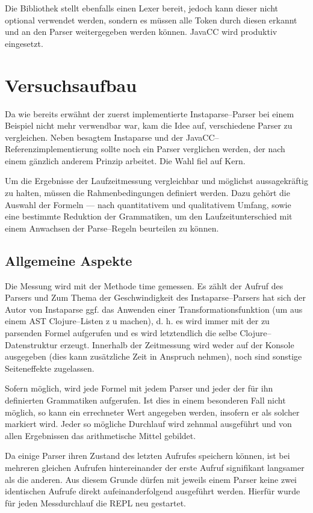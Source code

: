 \documentclass[ngerman,a4paper,abstracton,open=right,twoside=false,toc=listofnumbered,bibtotocnumbered]{scrreprt}
\begin{document}
Die Bibliothek stellt ebenfalls einen Lexer bereit, jedoch kann dieser nicht optional verwendet werden, sondern es müssen alle Token durch diesen erkannt und an den Parser weitergegeben werden können. JavaCC wird produktiv eingesetzt.

\chapter{Versuchsaufbau}

Da wie bereits erwähnt der zuerst implementierte Instaparse--Parser bei einem Beispiel nicht mehr verwendbar war, kam die Idee auf, verschiedene Parser zu vergleichen. Neben besagtem Instaparse und der JavaCC--Referenzimplementierung sollte noch ein Parser verglichen werden, der nach einem gänzlich anderem Prinzip arbeitet. Die Wahl fiel auf Kern.

Um die Ergebnisse der Laufzeitmessung vergleichbar und möglichst aussagekräftig zu halten, müssen die Rahmenbedingungen definiert werden. Dazu gehört die Auswahl der Formeln --- nach quantitativem und qualitativem Umfang, sowie eine bestimmte Reduktion der Grammatiken, um den Laufzeitunterschied mit einem Anwachsen der Parse--Regeln beurteilen zu können.

\section{Allgemeine Aspekte}

Die Messung wird mit der Methode \glqq{}time\grqq{} gemessen. Es zählt der Aufruf des Parsers und Zum Thema der Geschwindigkeit des Instaparse--Parsers hat sich der Autor von Instaparse ggf. das Anwenden einer Transformationsfunktion (um aus einem AST Clojure--Listen z
u machen), d. h. es wird immer mit der zu parsenden Formel aufgerufen und es wird letztendlich die selbe Clojure--Datenstruktur erzeugt. Innerhalb der Zeitmessung wird weder auf der Konsole ausgegeben (dies kann zusätzliche Zeit in Anspruch nehmen), noch sind sonstige Seiteneffekte zugelassen.

Sofern möglich, wird jede Formel mit jedem Parser und jeder der für ihn definierten Grammatiken aufgerufen. Ist dies in einem besonderen Fall nicht möglich, so kann ein errechneter Wert angegeben werden, insofern er als solcher markiert wird. Jeder so mögliche Durchlauf wird zehnmal ausgeführt und von allen Ergebnissen das arithmetische Mittel gebildet.

Da einige Parser ihren Zustand des letzten Aufrufes speichern können, ist bei mehreren gleichen Aufrufen hintereinander der erste Aufruf signifikant langsamer als die anderen. Aus diesem Grunde dürfen mit jeweils einem Parser keine zwei identischen Aufrufe direkt aufeinanderfolgend ausgeführt werden. Hierfür wurde für jeden Messdurchlauf die REPL neu gestartet.
\end{document}
